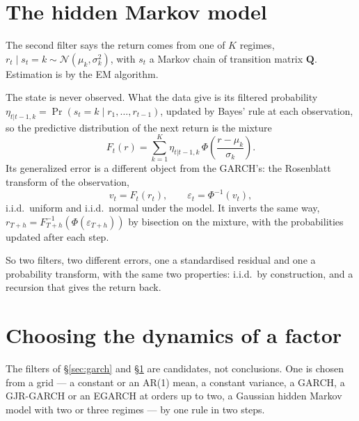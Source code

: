 \documentclass[11pt]{article}
\begin{document}
\section{The hidden Markov model}\label{sec:hmm}

The second filter says the return comes from one of $K$ regimes,
$r_t \mid s_t = k \sim \mathcal N(\mu_k, \sigma_k^2)$, with $s_t$ a Markov
chain of transition matrix $\mathbf Q$. Estimation is by the EM algorithm.

The state is never observed. What the data give is its filtered probability
$\eta_{t|t-1,k} = \Pr(s_t = k \mid r_1, \dots, r_{t-1})$, updated by Bayes'
rule at each observation, so the predictive distribution of the next return is
the mixture
\begin{equation}\label{eq:hmm_mixture}
  F_t(r) = \sum_{k=1}^{K} \eta_{t|t-1,k}\,
    \Phi\!\left( \frac{r - \mu_k}{\sigma_k} \right).
\end{equation}
Its generalized error is a different object from the GARCH's: the Rosenblatt
transform of the observation,
\begin{equation}\label{eq:rosenblatt}
  v_t = F_t(r_t), \qquad \varepsilon_t = \Phi^{-1}(v_t),
\end{equation}
i.i.d.\ uniform and i.i.d.\ normal under the model. It inverts the same way,
$r_{T+h} = F_{T+h}^{-1}(\Phi(\varepsilon_{T+h}))$ by bisection on the mixture,
with the probabilities updated after each step.

So two filters, two different errors, one a standardised residual and one a
probability transform, with the same two properties: i.i.d.\ by construction,
and a recursion that gives the return back.

\section{Choosing the dynamics of a factor}\label{sec:gof}

The filters of \S\ref{sec:garch} and \S\ref{sec:hmm} are candidates, not
conclusions. One is chosen from a grid --- a constant or an AR(1) mean, a
constant variance, a GARCH, a GJR-GARCH or an EGARCH at orders up to two, a
Gaussian hidden Markov model with two or three regimes --- by one rule in two
steps.
\end{document}
